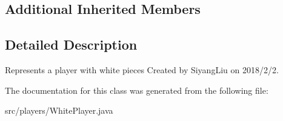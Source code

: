 \subsection*{Additional Inherited Members}


\subsection{Detailed Description}
Represents a player with white pieces Created by Siyang\+Liu on 2018/2/2. 

The documentation for this class was generated from the following file\+:\begin{DoxyCompactItemize}
\item 
src/players/White\+Player.\+java\end{DoxyCompactItemize}
